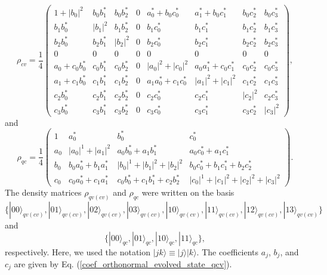 \begin{equation}
\rho_{cv}=\frac{1}{4}
 \begin{pmatrix}
 1+|b_{0}|^{2} & b_{0}b_{1}^{*} & b_{0}b_{2}^{*}  & 0 & a_{0}^{*}+b_{0}c_{0}^{*} & a_{1}^{*}+b_{0}c_{1}^{*} & b_{0}c_{2}^{*} & b_{0}c_{3}^{*} \\ 
 b_{1}b_{0}^{*}  & |b_{1}|^{2} & b_{1}b_{2}^{*}  & 0 & b_{1}c_{0}^{*} & b_{1}c_{1}^{*} & b_{1}c_{2}^{*} & b_{1}c_{3}^{*} \\ 
 b_{2}b_{0}^{*}  & b_{2}b_{1}^{*}  & |b_{2}|^{2} & 0 & b_{2}c_{0}^{*} & b_{2}c_{1}^{*} & b_{2}c_{2}^{*} & b_{2}c_{3}^{*} \\ 
 0 & 0 & 0 & 0 & 0 & 0 & 0 & 0 \\ 
 a_{0}+c_{0}b_{0}^{*} & c_{0}b_{1}^{*} & c_{0}b_{2}^{*} & 0 & |a_{0}|^{2}+|c_{0}|^{2} & a_{0}a_{1}^{*}+c_{0}c_{1}^{*} & c_{0}c_{2}^{*} & c_{0}c_{3}^{*} \\ 
 a_{1}+c_{1}b_{0}^{*} & c_{1}b_{1}^{*} & c_{1}b_{2}^{*} & 0 & a_{1}a_{0}^{*}+c_{1}c_{0}^{*} & |a_{1}|^{2}+|c_{1}|^{2} & c_{1}c_{2}^{*} & c_{1}c_{3}^{*} \\ 
 c_{2}b_{0}^{*} & c_{2}b_{1}^{*} & c_{2}b_{2}^{*} & 0 & c_{2}c_{0}^{*} & c_{2}c_{1}^{*} & |c_{2}|^{2} & c_{2}c_{3}^{*} \\ 
 c_{3}b_{0}^{*} & c_{3}b_{1}^{*} & c_{3}b_{2}^{*} & 0 & c_{3}c_{0}^{*} & c_{3}c_{1}^{*} & c_{3}c_{2}^{*} & |c_{3}|^{2}  
 \end{pmatrix},
\end{equation}
and
\begin{equation}
\rho_{qc}=\frac{1}{4}
 \begin{pmatrix}
  1 & a_{0}^{*} & b_{0}^{*} & c_{0}^{*} \\
  a_{0} & |a_{0}|^{1}+|a_{1}|^{2} & a_{0}b_{0}^{*}+a_{1}b_{1}^{*} & a_{0}c_{0}^{*}+a_{1}c_{1}^{*} \\
  b_{0} & b_{0}a_{0}^{*}+b_{1}a_{1}^{*} & |b_{0}|^{1}+|b_{1}|^{2}+|b_{2}|^{2}  & b_{0}c_{0}^{*}+b_{1}c_{1}^{*}+b_{2}c_{2}^{*}  \\
  c_{0} & c_{0}a_{0}^{*}+c_{1}a_{1}^{*}   & c_{0}b_{0}^{*}+c_{1}b_{1}^{*}+c_{2}b_{2}^{*} & |c_{0}|^{1}+|c_{1}|^{2}+|c_{2}|^{2}+|c_{3}|^{2}  
 \end{pmatrix}.
\end{equation}
The density matrices $\rho_{qv(cv)}$ and $\rho_{qc}$ were written on the basis 
\begin{equation}
\{|00\rangle_{qv(cv)}, |01\rangle_{qv(cv)}, |02\rangle_{qv(cv)}, |03\rangle_{qv(cv)}, |10\rangle_{qv(cv)}, |11\rangle_{qv(cv)}, |12\rangle_{qv(cv)}, |13\rangle_{qv(cv)}\}
\end{equation}
and
\begin{equation}
\{|00\rangle_{qc}, |01\rangle_{qc}, |10\rangle_{qc}, |11\rangle_{qc}\},
\end{equation}
respectively. Here, we used the notation $|jk\rangle \equiv |j\rangle |k\rangle$. The coefficients $a_{j}$, $b_{j}$, and $c_{j}$ are given by Eq. (\ref{coef_orthonormal_evolved_state_qcv}).




